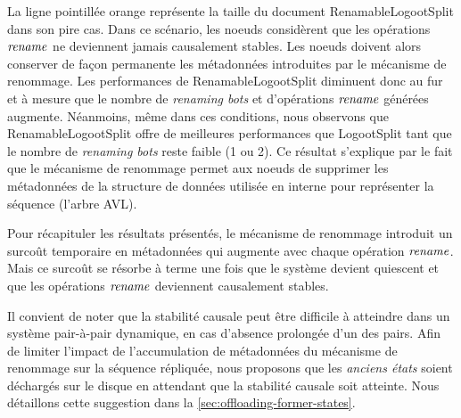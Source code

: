 La ligne pointillée orange représente la taille du document RenamableLogootSplit dans son pire cas.
Dans ce scénario, les noeuds considèrent que les opérations $\mathit{rename}$ ne deviennent jamais causalement stables.
Les noeuds doivent alors conserver de façon permanente les métadonnées introduites par le mécanisme de renommage.
Les performances de RenamableLogootSplit diminuent donc au fur et à mesure que le nombre de \emph{renaming bots} et d'opérations $\mathit{rename}$ générées augmente.
Néanmoins, même dans ces conditions, nous observons que RenamableLogootSplit offre de meilleures performances que LogootSplit tant que le nombre de \emph{renaming bots} reste faible (1 ou 2).
Ce résultat s'explique par le fait que le mécanisme de renommage permet aux noeuds de supprimer les métadonnées de la structure de données utilisée en interne pour représenter la séquence (\ie l'arbre AVL).

Pour récapituler les résultats présentés, le mécanisme de renommage introduit un surcoût temporaire en métadonnées qui augmente avec chaque opération $\mathit{rename}$.
Mais ce surcoût se résorbe à terme une fois que le système devient quiescent et que les opérations $\mathit{rename}$ deviennent causalement stables.

Il convient de noter que la stabilité causale peut être difficile à atteindre dans un système pair-à-pair dynamique, \eg en cas d'absence prolongée d'un des pairs.
Afin de limiter l'impact de l'accumulation de métadonnées du mécanisme de renommage sur la séquence répliquée, nous proposons que les \emph{anciens états} soient déchargés sur le disque en attendant que la stabilité causale soit atteinte.
Nous détaillons cette suggestion dans la \autoref{sec:offloading-former-states}.


